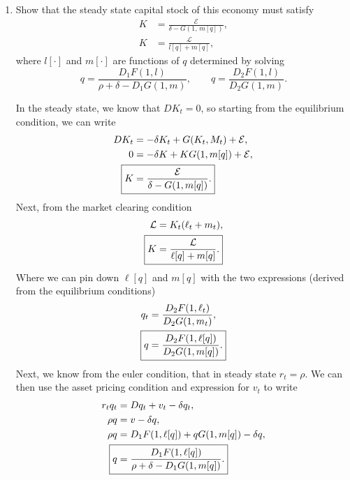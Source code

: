 \documentclass[11pt,english]{article}
\begin{document}
\begin{enumerate}
    \item[\textbf{b.}] Show that the steady state capital stock of this economy
        must satisfy
        \begin{align}
            K &= \frac{\mathcal{E}}{\delta - G(1,\, m[q])}, \label{eq:K1} \\[6pt]
            K &= \frac{\mathcal{L}}{l[q] + m[q]}, \label{eq:K2}
        \end{align}
        where $l[\cdot]$ and $m[\cdot]$ are functions of $q$ determined by
        solving
        \begin{equation}
            q = \frac{D_1 F(1,l)}{\rho + \delta - D_1 G(1,m)}, \qquad
            q = \frac{D_2 F(1,l)}{D_2 G(1,m)}. \label{eq:FOC}
        \end{equation}
    \begin{solution}
 	In the steady state, we know that $DK_t = 0$, so starting from the equilibrium condition, we can write
\begin{align*}
DK_t &= -\delta K_t + G(K_t, M_t) + \mathcal{E},\\
0 &= -\delta K + KG(1, m[q]) + \mathcal{E},\\
\Aboxed{K &= \frac{\mathcal{E}}{\delta - G(1, m[q])}.}
\end{align*} Next, from the market clearing condition
\begin{align*}
\mathcal{L} &= K_t(\ell_t+ m_t),\\
\Aboxed{K &= \frac{\mathcal{L}}{\ell[q]+ m[q]}.}
\end{align*}
Where we can pin down $\ell[q]$ and $m[q]$ with the two expressions (derived from the equilibrium conditions)
\begin{align*}
q_t  &= \frac{D_2 F(1, \ell_t)}{D_2 G(1, m_t)},\\
\Aboxed{q &= \frac{D_2 F(1, \ell[q])}{D_2 G(1, m[q])}.}
\end{align*} Next, we know from the euler condition, that in steady state $r_t = \rho$. We can then use the asset pricing condition and expression for $v_t$ to write
\begin{align*}
r_tq_t &= Dq_t + v_t - \delta q_t,\\
\rho q &= v - \delta q,\\
\rho q &= D_1F(1, \ell[q]) + q G(1, m[q]) - \delta q,\\
\Aboxed{q &= \frac{D_1F(1, \ell[q])}{\rho + \delta - D_1G(1, m[q])}.}
\end{align*}
    \end{solution}
 

\end{enumerate}
\end{document}
